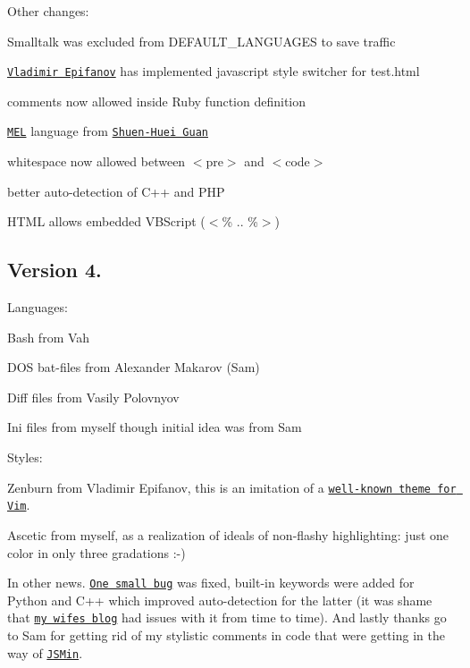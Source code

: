 Other changes\+:


\begin{DoxyItemize}
\item Smalltalk was excluded from D\+E\+F\+A\+U\+L\+T\+\_\+\+L\+A\+N\+G\+U\+A\+G\+ES to save traffic
\item \href{http://voldmar.ya.ru/}{\tt Vladimir Epifanov} has implemented javascript style switcher for test.\+html
\item comments now allowed inside Ruby function definition
\item \href{http://en.wikipedia.org/wiki/Maya_Embedded_Language}{\tt M\+EL} language from \href{http://drakeguan.org/}{\tt Shuen-\/\+Huei Guan}
\item whitespace now allowed between {\ttfamily $<$pre$>$} and {\ttfamily $<$code$>$}
\item better auto-\/detection of C++ and P\+HP
\item H\+T\+ML allows embedded V\+B\+Script ({\ttfamily $<$\% .. \%$>$})
\end{DoxyItemize}

\subsection*{Version 4.}

Languages\+:


\begin{DoxyItemize}
\item Bash from Vah
\item D\+OS bat-\/files from Alexander Makarov (Sam)
\item Diff files from Vasily Polovnyov
\item Ini files from myself though initial idea was from Sam
\end{DoxyItemize}

Styles\+:


\begin{DoxyItemize}
\item Zenburn from Vladimir Epifanov, this is an imitation of a \href{http://en.wikipedia.org/wiki/Zenburn}{\tt well-\/known theme for Vim}.
\item Ascetic from myself, as a realization of ideals of non-\/flashy highlighting\+: just one color in only three gradations \+:-\/)
\end{DoxyItemize}

In other news. \href{http://softwaremaniacs.org/forum/viewtopic.php?id=1823}{\tt One small bug} was fixed, built-\/in keywords were added for Python and C++ which improved auto-\/detection for the latter (it was shame that \href{http://alenacpp.blogspot.com/}{\tt my wife\textquotesingle{}s blog} had issues with it from time to time). And lastly thanks go to Sam for getting rid of my stylistic comments in code that were getting in the way of \href{http://code.google.com/p/jsmin-php/}{\tt J\+S\+Min}.

